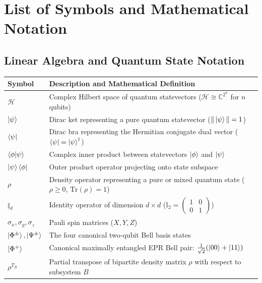 \chapter*{List of Symbols and Mathematical Notation}


\section*{Linear Algebra and Quantum State Notation}

\begin{tabularx}{\textwidth}{lX}
    \toprule
    \textbf{Symbol} & \textbf{Description and Mathematical Definition} \\
    \midrule
    $\mathcal{H}$ & Complex Hilbert space of quantum statevectors ($\mathcal{H} \cong \mathbb{C}^{2^n}$ for $n$ qubits) \\
    $\ket{\psi}$ & Dirac ket representing a pure quantum statevector ($\|\ket{\psi}\| = 1$) \\
    $\bra{\psi}$ & Dirac bra representing the Hermitian conjugate dual vector ($\bra{\psi} = \ket{\psi}^\dagger$) \\
    $\braket{\phi|\psi}$ & Complex inner product between statevectors $\ket{\phi}$ and $\ket{\psi}$ \\
    $\ket{\psi}\bra{\phi}$ & Outer product operator projecting onto state subspace \\
    $\rho$ & Density operator representing a pure or mixed quantum state ($\rho \ge 0$, $\text{Tr}(\rho) = 1$) \\
    $\mathbb{I}_d$ & Identity operator of dimension $d \times d$ ($\mathbb{I}_2 = \begin{pmatrix} 1 & 0 \\ 0 & 1 \end{pmatrix}$) \\
    $\sigma_x, \sigma_y, \sigma_z$ & Pauli spin matrices ($X, Y, Z$) \\
    $\ket{\Phi^\pm}, \ket{\Psi^\pm}$ & The four canonical two-qubit Bell basis states \\
    $\ket{\Phi^+}$ & Canonical maximally entangled EPR Bell pair: $\frac{1}{\sqrt{2}}(\ket{00} + \ket{11})$ \\
    $\rho^{T_B}$ & Partial transpose of bipartite density matrix $\rho$ with respect to subsystem $B$ \\

\end{tabularx}
